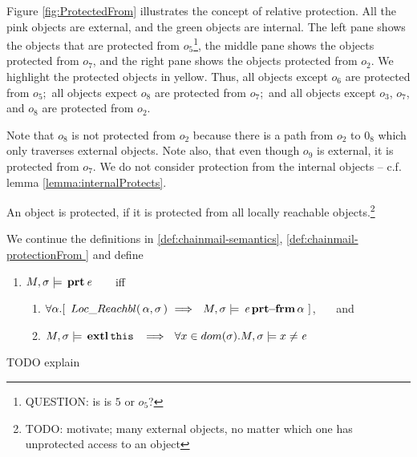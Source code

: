  
Figure \ref{fig:ProtectedFrom} illustrates the concept of relative protection. All the pink objects are external, and the green objects are internal. The left pane shows the objects that are protected from $o_5$\footnote{QUESTION: is is $5$ or $o_5$?}, the middle pane shows the objects protected from $o_7$, and the right pane shows the objects protected from $o_2$. We highlight the protected objects in yellow. Thus, all objects except $o_6$ are protected from $o_5$;\ all objects expect $o_8$ are protected from $o_7$;\ and all objects except $o_3$, $o_7$, and $o_8$ are protected from $o_2$. 

Note that $o_8$ is not protected from $o_2$ because there is a path from $o_2$ to $0_8$ which only traverses external objects. Note also, that even though $o_9$ is external, it is protected from $o_7$.
We do not consider protection from the internal objects -- c.f. lemma \ref{lemma:internalProtects}.

\vspace{.1in}

An object is protected, if it is protected from all locally reachable objects.\footnote{TODO: motivate; many external objects, no matter which one has unprotected access to an object }
\begin{definition} 
\label{def:chainmail-protection}
We continue the definitions in \ref{def:chainmail-semantics}, \ref{def:chainmail-protectionFrom } and  define   
\begin{enumerate}
\item
$M , \sigma \models {\ensuremath{\, \mathbf{prt}}\, \mathit{e}\, }$  \ \ \ iff \ \ \ 
\begin{enumerate}
\item
{$\forall \alpha.[ \  \LRelevant {\alpha}  {\sigma}\ \Longrightarrow \ \  \satisfiesA{M}{\sigma}{\protectedFrom{\re} {{\alpha}}}\ ] $}, \ \ \ and 
\item
$\satisfiesA{M}{\sigma}{\external{\prg{this}}}\ \ \Longrightarrow\ \ \forall x\in dom(\sigma).\satisfiesA{M}{\sigma}{x\neq \re}$
\end{enumerate}
\end{enumerate}
\end{definition}
 
 TODO explain
 
